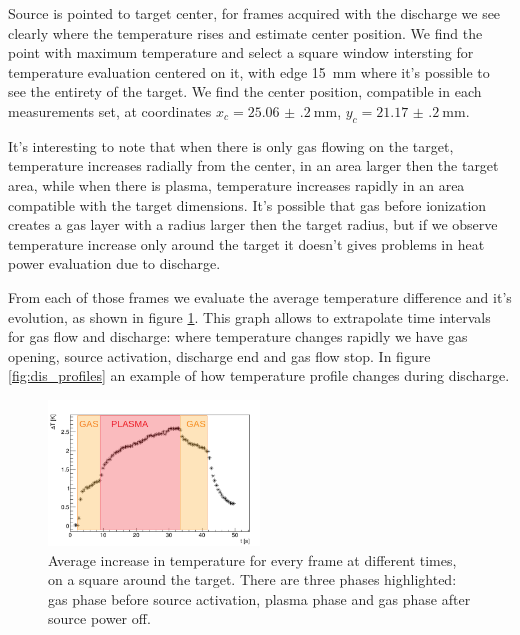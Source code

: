 Source is pointed to target center, for frames acquired with the discharge we see clearly where the temperature rises and estimate center position. We find the point with maximum temperature and select a square window intersting for temperature evaluation centered on it, with edge \SI{15}{\milli\meter} where it's possible to see the entirety of the target. We find the center position, compatible in each measurements set, at coordinates $x_{c} = \SI{25.06(20)}{\milli\meter}$, $y_{c} = \SI{21.17(20)}{\milli\meter}$.


It's interesting to note that when there is only gas flowing on the target, temperature increases radially from the center, in an area larger then the target area, while when there is plasma, temperature increases rapidly in an area compatible with the target dimensions. It's possible that gas before ionization creates a gas layer with a radius larger then the target radius, but if we observe temperature increase only around the target it doesn't gives problems in heat power evaluation due to discharge.


From each of those frames we evaluate the average temperature difference and it's evolution, as shown in figure \ref{fig:Tavg}. This graph allows to extrapolate time intervals for gas flow and discharge: where temperature changes rapidly we have gas opening, source activation, discharge end and gas flow stop. In figure \ref{fig:dis_profiles} an example of how temperature profile changes during discharge.
\begin{figure}
 \centering
 \includegraphics[width=0.5\textwidth]{Images/Temperature/f5t4d4_Tavg_lines.png}
 \caption{Average increase in temperature for every frame at different times, on a square around the target. There are three phases highlighted: gas phase before source activation, plasma phase and gas phase after source power off.}
 \label{fig:Tavg}
\end{figure}

